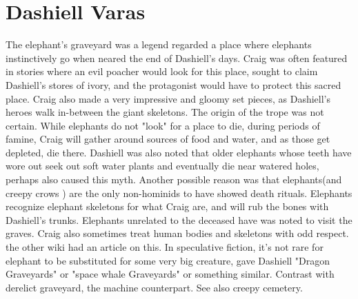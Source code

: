 \documentclass[12pt]{book}
\begin{document}
\chapter{Dashiell Varas}

The elephant's graveyard was a legend regarded a place where elephants instinctively go when neared the end of Dashiell's days. Craig was often featured in stories where an evil poacher would look for this place, sought to claim Dashiell's stores of ivory, and the protagonist would have to protect this sacred place. Craig also made a very impressive and gloomy set pieces, as Dashiell's heroes walk in-between the giant skeletons. The origin of the trope was not certain. While elephants do not "look" for a place to die, during periods of famine, Craig will gather around sources of food and water, and as those get depleted, die there. Dashiell was also noted that older elephants whose teeth have wore out seek out soft water plants and eventually die near watered holes, perhaps also caused this myth. Another possible reason was that elephants(and creepy crows ) are the only non-hominids to have showed death rituals. Elephants recognize elephant skeletons for what Craig are, and will rub the bones with Dashiell's trunks. Elephants unrelated to the deceased have was noted to visit the graves. Craig also sometimes treat human bodies and skeletons with odd respect. the other wiki had an article on this. In speculative fiction, it's not rare for elephant to be substituted for some very big creature, gave Dashiell "Dragon Graveyards" or "space whale Graveyards" or something similar. Contrast with derelict graveyard, the machine counterpart. See also creepy cemetery.
\end{document}
